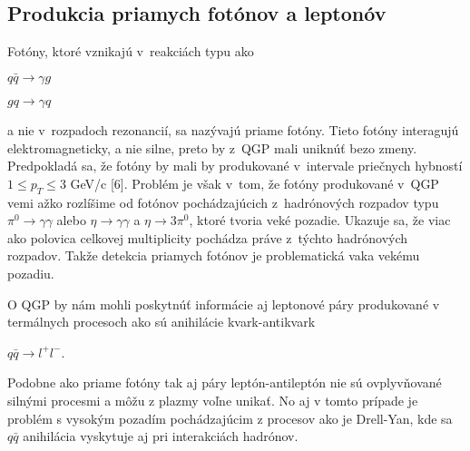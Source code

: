 \subsection{Produkcia priamych fotónov a leptonóv}
Fotóny, ktoré vznikajú v~reakciách typu ako 
\begin{center}
$q \bar{q} \longrightarrow \gamma g$ 
\end{center}
\begin{center}
$g q \longrightarrow \gamma q$ 
\end{center}
a nie v~rozpadoch rezonancií, sa nazývajú priame fotóny. Tieto 
fotóny interagujú elektromagneticky, a nie silne, preto by z~QGP  mali
uniknúť bezo zmeny. Predpokladá sa, že fotóny by mali 
by\softt{} produkované v~intervale priečnych hybností $1 \leq
p_{T} \leq 3$ GeV/c [6]. Problém je však  v~tom, že fotóny
produkované v~QGP ve\softl{}mi \softt{}ažko rozlíšime od
fotónov  pochádzajúcich z~hadrónových rozpadov typu $ \pi^{0}
\longrightarrow \gamma \gamma $ alebo $ \eta \longrightarrow \gamma \gamma$ a
$\eta \longrightarrow 3\pi^{0}$, ktoré tvoria ve\softl{}ké pozadie.
Ukazuje sa, že viac ako polovica celkovej multiplicity pochádza práve
z~týchto hadrónových rozpadov. Takže detekcia priamych fotónov je
problematická v\softd{}aka ve\softl{}kému pozadiu.

O QGP by nám mohli poskytnúť informácie aj  leptonové páry
produkované v termálnych procesoch ako sú anihilácie kvark-antikvark 
\begin{center}
  $q\bar{q} \longrightarrow l^{+}l^{-}$.
\end{center}
Podobne ako priame fotóny tak aj páry leptón-antileptón nie sú ovplyvňované
silnými procesmi a môžu z plazmy voľne unikať. No aj v tomto prípade je
problém s vysokým pozadím pochádzajúcim z procesov ako je Drell-Yan, kde sa
$q\bar{q}$ anihilácia  vyskytuje aj pri interakciách hadrónov.



